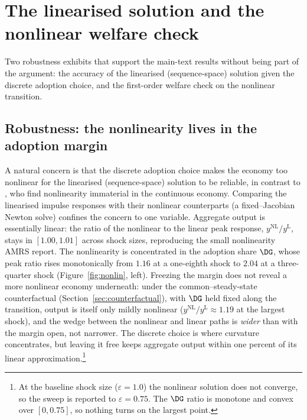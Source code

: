 \section{The linearised solution and the nonlinear welfare check}\label{app:nonlin}
\label{app:nonlin}

Two robustness exhibits that support the main-text results without being part
of the argument: the accuracy of the linearised (sequence-space) solution given
the discrete adoption choice, and the first-order welfare check on the nonlinear
transition.

\subsection{Robustness: the nonlinearity lives in the adoption margin}
\label{sec:nonlin}

A natural concern is that the discrete adoption choice makes the economy too
nonlinear for the linearised (sequence-space) solution to be reliable, in
contrast to \citet{ARS2024}, who find nonlinearity immaterial in the continuous
economy. Comparing the linearised impulse responses with their nonlinear
counterparts (a fixed--Jacobian Newton solve) confines the concern to one
variable. Aggregate output is essentially linear: the ratio of the nonlinear to
the linear peak response, $y^{\mathrm{NL}}/y^{\mathrm{L}}$, stays in $[1.00,1.01]$
across shock sizes, reproducing the small nonlinearity AMRS report. The
nonlinearity is concentrated in the adoption share $\DG$, whose peak ratio rises
monotonically from $1.16$ at a one-eighth shock to $2.04$ at a three-quarter
shock (Figure~\ref{fig:nonlin}, left). Freezing the margin does not reveal a more
nonlinear economy underneath: under the common--steady-state counterfactual
(Section~\ref{sec:counterfactual}), with $\DG$ held fixed along the transition,
output is itself only mildly nonlinear ($y^{\mathrm{NL}}/y^{\mathrm{L}}\approx
1.19$ at the largest shock), and the wedge between the nonlinear and linear paths
is \emph{wider} than with the margin open, not narrower. The discrete choice is
where curvature concentrates, but leaving it free keeps aggregate output within
one percent of its linear approximation.\footnote{At the baseline shock size
($\varepsilon=1.0$) the nonlinear solution does not converge, so the sweep is
reported to $\varepsilon=0.75$. The $\DG$
ratio is monotone and convex over $[0,0.75]$, so nothing turns on the largest
point.}


